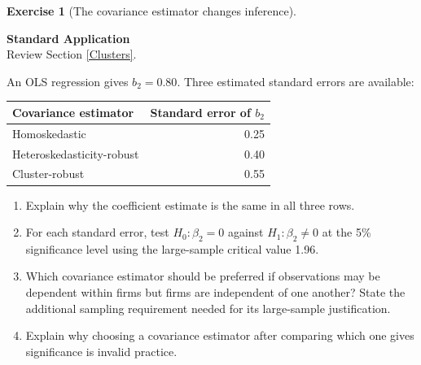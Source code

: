 \documentclass[
  11pt,
]{book}
\providecommand{\tightlist}{%
  \setlength{\itemsep}{0pt}\setlength{\parskip}{0pt}}
\theoremstyle{definition}
\theoremstyle{definition}
\theoremstyle{definition}
\newtheorem{exercise}{Exercise}[chapter]
\theoremstyle{definition}
\theoremstyle{remark}
\begin{document}
\begin{exercisebox}

\begin{exercise}[The covariance estimator changes inference]
\protect\hypertarget{exr:regressions-robust-inference}{}\label{exr:regressions-robust-inference}

\textbf{Standard \textbar{} Application}\\
Review Section \ref{Clusters}.

An OLS regression gives \(b_2=0.80\). Three estimated standard errors are available:

\begin{longtable}[]{@{}lr@{}}
\toprule\noalign{}
Covariance estimator & Standard error of \(b_2\) \\
\midrule\noalign{}
\endhead
\bottomrule\noalign{}
\endlastfoot
Homoskedastic & 0.25 \\
Heteroskedasticity-robust & 0.40 \\
Cluster-robust & 0.55 \\
\end{longtable}

\begin{enumerate}
\def\labelenumi{\arabic{enumi}.}
\tightlist
\item
  Explain why the coefficient estimate is the same in all three rows.
\item
  For each standard error, test \(H_0:\beta_2=0\) against \(H_1:\beta_2\ne0\) at the 5\% significance level using the large-sample critical value 1.96.
\item
  Which covariance estimator should be preferred if observations may be dependent within firms but firms are independent of one another? State the additional sampling requirement needed for its large-sample justification.
\item
  Explain why choosing a covariance estimator after comparing which one gives significance is invalid practice.
\end{enumerate}

\end{exercise}

\end{exercisebox}

\end{document}
